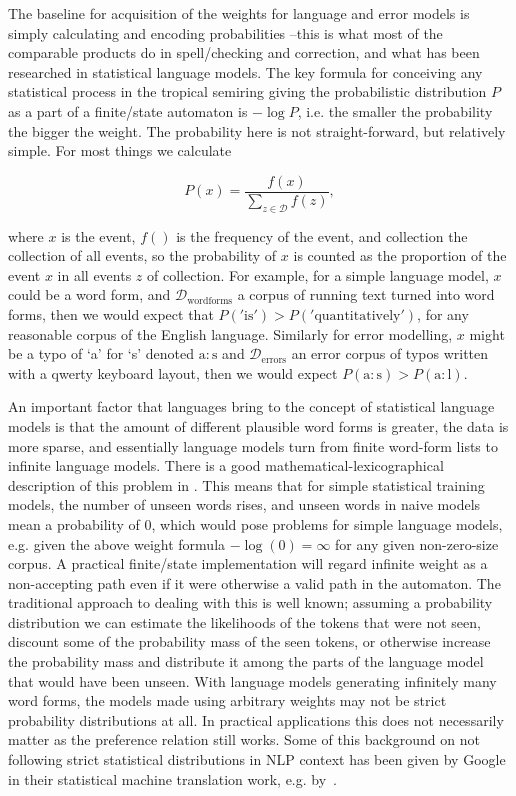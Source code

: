 \documentclass[officiallayout,final]{unihelcompling}
\begin{document}
The baseline for acquisition of the weights for language and error models is
simply calculating and encoding probabilities --this is what most of the
comparable products do in spell\-/checking and correction, and what has been
researched in statistical language models. The key formula for conceiving any
statistical process in the tropical semiring giving the probabilistic
distribution $P$ as a part of a finite\-/state automaton is $-\log P$, i.e. the
smaller the probability the bigger the weight. The probability here is not
straight-forward, but relatively simple. For most things we calculate

\begin{equation} 
    P(x) = \frac{f(x)}{\sum_{z \in \mathcal{D}} f(z)},
\end{equation}

\noindent where $x$ is the event, $f()$ is the frequency of the event, and
\gls{collection} the collection of all events, so the probability of $x$ is
counted as the proportion of the event $x$ in all events $z$ of
\gls{collection}. For example, for a simple language model, $x$ could be a word
form, and $\mathcal{D}_\mathrm{word forms}$ a corpus of running text turned
into word forms, then we would expect that $P('\mathrm{is}') >
P('\mathrm{quantitatively}')$, for any reasonable corpus of the English
language. Similarly for error modelling, $x$ might be a typo of `a' for `s'
denoted $\mathrm{a}:\mathrm{s}$ and $\mathcal{D}_\mathrm{errors}$ an error
corpus of typos written with a qwerty keyboard layout, then we would expect
$P(\mathrm{a}:\mathrm{s}) > P(\mathrm{a}:\mathrm{l})$.

An important factor that  languages bring to the concept of
statistical language models is that the amount of different plausible word
forms is greater, the data is more sparse, and essentially language models turn
from finite word-form lists to infinite language models.  There is a good
mathematical-lexicographical description of this problem in
\citet{kornai2002many}. This means that for simple statistical training models,
the number of unseen words rises, and unseen words in naive models mean a
probability of $0$, which would pose problems for simple language models, e.g.
given the above weight formula $-\log(0) = \infty$ for any given non-zero-size
corpus. A practical finite\-/state implementation will regard infinite weight
as a non-accepting path even if it were otherwise a valid path in the
automaton.  The traditional approach to dealing with this is well known;
assuming a probability distribution we can estimate the likelihoods of the
tokens that were not seen, discount some of the probability mass of the seen
tokens, or otherwise increase the probability mass and distribute it among the
parts of the language model that would have been unseen. With language models
generating infinitely many word forms, the models made using arbitrary weights
may not be strict probability distributions at all. In practical applications
this does not necessarily matter as the preference relation still works. Some
of this background on not following strict statistical distributions in NLP
context has been given by Google in their statistical machine translation work,
e.g.  by~\citet{brants2007large}.
\end{document}
